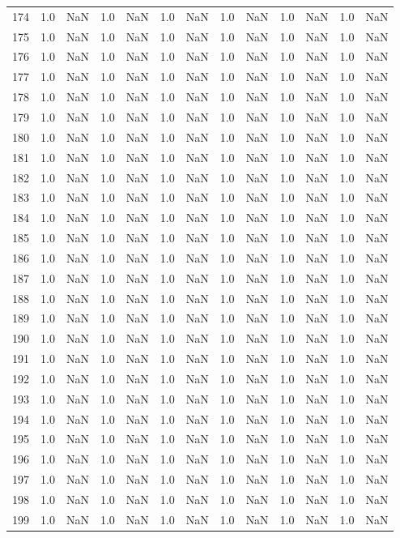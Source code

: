 \begin{tabular}{lrrrrrrrrrrrr}
174 & 1.0 & NaN & 1.0 & NaN & 1.0 & NaN & 1.0 & NaN & 1.0 & NaN & 1.0 & NaN \\
175 & 1.0 & NaN & 1.0 & NaN & 1.0 & NaN & 1.0 & NaN & 1.0 & NaN & 1.0 & NaN \\
176 & 1.0 & NaN & 1.0 & NaN & 1.0 & NaN & 1.0 & NaN & 1.0 & NaN & 1.0 & NaN \\
177 & 1.0 & NaN & 1.0 & NaN & 1.0 & NaN & 1.0 & NaN & 1.0 & NaN & 1.0 & NaN \\
178 & 1.0 & NaN & 1.0 & NaN & 1.0 & NaN & 1.0 & NaN & 1.0 & NaN & 1.0 & NaN \\
179 & 1.0 & NaN & 1.0 & NaN & 1.0 & NaN & 1.0 & NaN & 1.0 & NaN & 1.0 & NaN \\
180 & 1.0 & NaN & 1.0 & NaN & 1.0 & NaN & 1.0 & NaN & 1.0 & NaN & 1.0 & NaN \\
181 & 1.0 & NaN & 1.0 & NaN & 1.0 & NaN & 1.0 & NaN & 1.0 & NaN & 1.0 & NaN \\
182 & 1.0 & NaN & 1.0 & NaN & 1.0 & NaN & 1.0 & NaN & 1.0 & NaN & 1.0 & NaN \\
183 & 1.0 & NaN & 1.0 & NaN & 1.0 & NaN & 1.0 & NaN & 1.0 & NaN & 1.0 & NaN \\
184 & 1.0 & NaN & 1.0 & NaN & 1.0 & NaN & 1.0 & NaN & 1.0 & NaN & 1.0 & NaN \\
185 & 1.0 & NaN & 1.0 & NaN & 1.0 & NaN & 1.0 & NaN & 1.0 & NaN & 1.0 & NaN \\
186 & 1.0 & NaN & 1.0 & NaN & 1.0 & NaN & 1.0 & NaN & 1.0 & NaN & 1.0 & NaN \\
187 & 1.0 & NaN & 1.0 & NaN & 1.0 & NaN & 1.0 & NaN & 1.0 & NaN & 1.0 & NaN \\
188 & 1.0 & NaN & 1.0 & NaN & 1.0 & NaN & 1.0 & NaN & 1.0 & NaN & 1.0 & NaN \\
189 & 1.0 & NaN & 1.0 & NaN & 1.0 & NaN & 1.0 & NaN & 1.0 & NaN & 1.0 & NaN \\
190 & 1.0 & NaN & 1.0 & NaN & 1.0 & NaN & 1.0 & NaN & 1.0 & NaN & 1.0 & NaN \\
191 & 1.0 & NaN & 1.0 & NaN & 1.0 & NaN & 1.0 & NaN & 1.0 & NaN & 1.0 & NaN \\
192 & 1.0 & NaN & 1.0 & NaN & 1.0 & NaN & 1.0 & NaN & 1.0 & NaN & 1.0 & NaN \\
193 & 1.0 & NaN & 1.0 & NaN & 1.0 & NaN & 1.0 & NaN & 1.0 & NaN & 1.0 & NaN \\
194 & 1.0 & NaN & 1.0 & NaN & 1.0 & NaN & 1.0 & NaN & 1.0 & NaN & 1.0 & NaN \\
195 & 1.0 & NaN & 1.0 & NaN & 1.0 & NaN & 1.0 & NaN & 1.0 & NaN & 1.0 & NaN \\
196 & 1.0 & NaN & 1.0 & NaN & 1.0 & NaN & 1.0 & NaN & 1.0 & NaN & 1.0 & NaN \\
197 & 1.0 & NaN & 1.0 & NaN & 1.0 & NaN & 1.0 & NaN & 1.0 & NaN & 1.0 & NaN \\
198 & 1.0 & NaN & 1.0 & NaN & 1.0 & NaN & 1.0 & NaN & 1.0 & NaN & 1.0 & NaN \\
199 & 1.0 & NaN & 1.0 & NaN & 1.0 & NaN & 1.0 & NaN & 1.0 & NaN & 1.0 & NaN \\
\bottomrule
\end{tabular}
